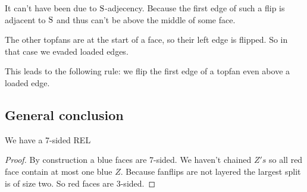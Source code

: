 It can't have been due to $\mathrm{S}$-adjecency. Because the first edge of such a flip is adjacent to $\mathrm{S}$ and thus can't be above the middle of some face.

The other topfans are at the start of a face, so their left edge is flipped. So in that case we evaded loaded edges.

This leads to the following rule: we flip the first edge of a topfan even above a loaded edge.


\subsection{General conclusion}
\begin{lemma}
  \label{lm:}
  We have a 7-sided REL
\end{lemma}

\begin{proof}
  By construction a blue faces are 7-sided. We haven't chained $Z's$ so all red face contain at most one blue $Z$. Because fanflips are not layered the largest split is of size two. So red faces are 3-sided.
\end{proof}
